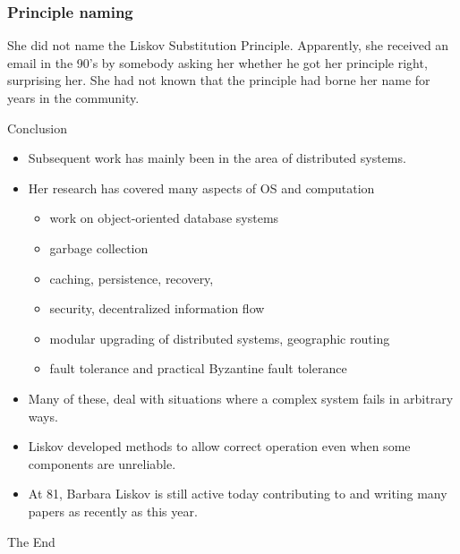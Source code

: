 \documentclass{beamer}
\begin{document}
\begin{frame}
\frametitle{Principle naming}
She did not name the Liskov Substitution Principle. Apparently, she received an email in the 90’s by somebody asking her whether he got her principle right, surprising her. She had not known that the principle had borne her name for years in the community.
\end{frame}

\begin{frame}{Conclusion}
\begin{itemize}
\item Subsequent work has mainly been in the area of distributed systems. 
\item Her research has covered many aspects of OS and computation \begin{itemize}
    \item work on object-oriented database systems
    \item  garbage collection
    \item caching, persistence, recovery, 
    \item security, decentralized information flow
    \item modular upgrading of distributed systems, geographic routing
    \item fault tolerance and practical Byzantine fault tolerance
\end{itemize}  
\item Many of these, deal with situations where a complex system fails in arbitrary ways. 
\item Liskov developed methods to allow correct operation even when some components are unreliable.
\item At 81, Barbara Liskov is still active today contributing to and writing many papers as recently as this year.  

\end{itemize}
\end{frame}




\begin{frame}
\Huge{\centerline{The End}}
\end{frame}

\end{document}
